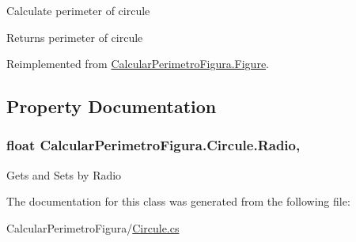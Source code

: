 Calculate perimeter of circule 

\begin{DoxyReturn}{Returns}
perimeter of circule
\end{DoxyReturn}


Reimplemented from \hyperlink{class_calcular_perimetro_figura_1_1_figure_a26c46475b59d2855438e752aad406c6a}{Calcular\+Perimetro\+Figura.\+Figure}.



\subsection{Property Documentation}
\hypertarget{class_calcular_perimetro_figura_1_1_circule_ae57ba180a15d8f68fe180889966b57f8}{}
\subsubsection[{Radio}]{\setlength{\rightskip}{0pt plus 5cm}float Calcular\+Perimetro\+Figura.\+Circule.\+Radio\hspace{0.3cm}{\ttfamily [get]}, {\ttfamily [set]}}\label{class_calcular_perimetro_figura_1_1_circule_ae57ba180a15d8f68fe180889966b57f8}


Gets and Sets by Radio 



The documentation for this class was generated from the following file\+:\begin{DoxyCompactItemize}
\item 
Calcular\+Perimetro\+Figura/\hyperlink{_circule_8cs}{Circule.\+cs}\end{DoxyCompactItemize}
